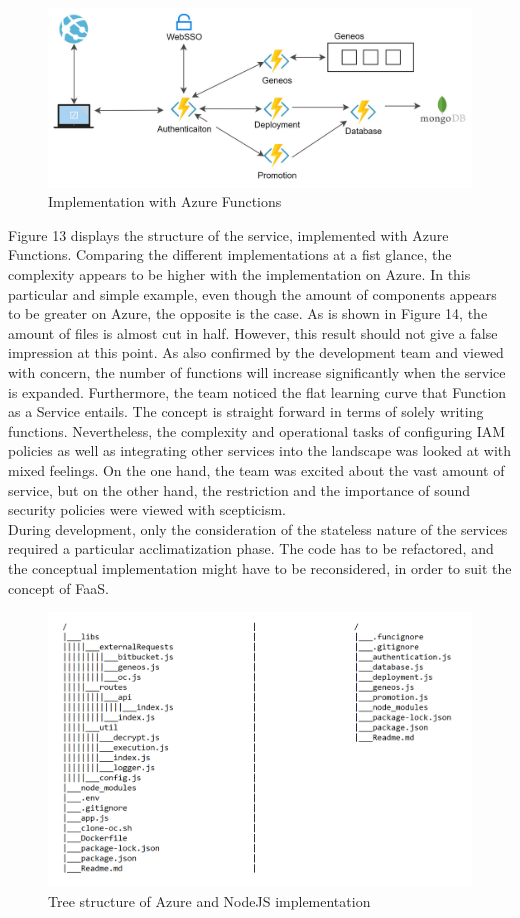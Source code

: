 \documentclass[a4paper,twoside,11pt, pagesize]{scrartcl}
\begin{document}
\begin{spacing}{1.2}
\begin{figure}[H]
\label{fig:azure}
\centering
\includegraphics[width=1\textwidth]{azure.jpg}
\caption{Implementation with Azure Functions}
\end{figure} 
Figure 13 displays the structure of the service, implemented with Azure Functions. Comparing the different implementations at a fist glance, the complexity appears to be higher with the implementation on Azure. In this particular and simple example, even though the amount of components appears to be greater on Azure, the opposite is the case. As is shown in Figure 14, the amount of files is almost cut in half. However, this result should not give a false impression at this point. As also confirmed by the development team and viewed with concern, the number of functions will increase significantly when the service is expanded. Furthermore, the team noticed the flat learning curve that Function as a Service entails. The concept is straight forward in terms of solely writing functions. Nevertheless, the complexity and operational tasks of configuring IAM policies as well as integrating other services into the landscape was looked at with mixed feelings.
On the one hand, the team was excited about the vast amount of service, but on the other hand, the restriction and the importance of sound security policies were viewed with scepticism.\\
During development, only the consideration of the stateless nature of the services required a particular acclimatization phase. The code has to be refactored, and the conceptual implementation might have to be reconsidered, in order to suit the concept of FaaS. 
\begin{figure}[H]
\label{fig:tree2}
\centering
\includegraphics[width=1\textwidth]{tree2.png}
\caption{Tree structure of Azure and NodeJS implementation}
\end{figure} 

\end{spacing}
\end{document}
